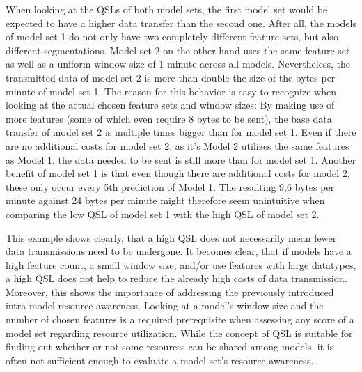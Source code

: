 When looking at the QSLs of both model sets, the first model set would be expected to have a higher data transfer than the second one. After all, the models of model set 1 do not only have two completely different feature sets, but also different segmentations. Model set 2 on the other hand uses the same feature set as well as a uniform window size of 1 minute across all models. Nevertheless, the transmitted data of model set 2 is more than double the size of the bytes per minute of model set 1. The reason for this behavior is easy to recognize when looking at the actual chosen feature sets and window sizes: By making use of more features (some of which even require 8 bytes to be sent), the base data transfer of model set 2 is multiple times bigger than for model set 1. Even if there are no additional costs for model set 2, as it’s Model 2 utilizes the same features as Model 1, the data needed to be sent is still more than for model set 1. Another benefit of model set 1 is that even though there are additional costs for model 2, these only occur every 5th prediction of Model 1. The resulting 9,6 bytes per minute against 24 bytes per minute might therefore seem unintuitive when comparing the low QSL of model set 1 with the high QSL of model set 2. 

This example shows clearly, that a high QSL does not necessarily mean fewer data transmissions need to be undergone. It becomes clear, that if models have a high feature count, a small window size, and/or use features with large datatypes, a high QSL does not help to reduce the already high costs of data transmission. Moreover, this shows the importance of addressing the previously introduced intra-model resource awareness. Looking at a model’s window size and the number of chosen features is a required prerequisite when assessing any score of a model set regarding resource utilization. While the concept of QSL is suitable for finding out whether or not some resources can be shared among models, it is often not sufficient enough to evaluate a model set’s resource awareness. 

